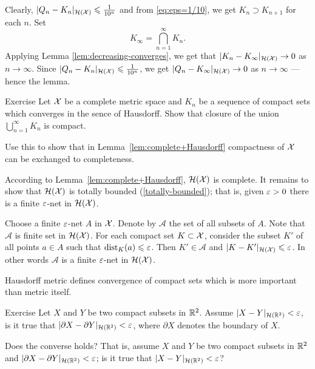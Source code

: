 Clearly, $|Q_n-K_n|_{\mathcal{H}(\mathcal{X})}\leqslant \tfrac1{10^n}$ and from \ref{eq:eps=1/10}, we get
$K_n\supset K_{n+1}$ 
for each $n$.
Set 
$$K_\infty=\bigcap_{n=1}^\infty K_n.$$
Applying Lemma \ref{lem:decreasing-converges},
we get that $|K_n-K_\infty|_{\mathcal{H}(\mathcal{X})}\to 0$ as $n\to\infty$.
Since $|Q_n-K_n|_{\mathcal{H}(\mathcal{X})}\leqslant \tfrac1{10^n}$, we get $|Q_n-K_\infty|_{\mathcal{H}(\mathcal{X})}\to 0$ as $n\to\infty$ --- hence the lemma.
\qeds

\begin{thm}{Exercise}
Let $\mathcal{X}$ be a complete metric space and $K_n$ be a sequence of compact sets 
which converges in the sence of Hausdorff.
Show that closure of the union $\bigcup_{n=1}^\infty K_n$ is compact.

Use this to show that in Lemma~\ref{lem:complete+Hausdorff} compactness of $\mathcal{X}$ can be exchanged to completeness.
\end{thm}

According to Lemma~\ref{lem:complete+Hausdorff},
$\mathcal{H}(\mathcal{X})$ is complete.
It remains to show that $\mathcal{H}(\mathcal{X})$ is totally bounded (\ref{totally-bounded});
that is, given $\varepsilon>0$ there is a finite $\varepsilon$-net in $\mathcal{H}(\mathcal{X})$.

Choose a finite $\varepsilon$-net $A$ in $\mathcal{X}$.
Denote by $\mathcal{A}$ the set of all subsets of $A$.
Note that  $\mathcal{A}$ is finite set in $\mathcal{H}(\mathcal{X})$.
For each compact set $K\subset \mathcal{X}$, consider the subset $K'$ of all points $a\in A$
such that $\mathrm{dist}_K(a)\leqslant \varepsilon$.
Then $K' \in \mathcal{A}$ and $|K-K'|_{\mathcal{H}(\mathcal{X})}\leqslant\varepsilon$.
In other words $\mathcal{A}$ is a finite $\varepsilon$-net in $\mathcal{H}(\mathcal{X})$.
\qeds

Hausdorff metric defines convergence of compact sets which is more important than metric itself.

\begin{thm}{Exercise}\label{ex:Hausdorff-bry}
Let $X$ and $Y$ be two compact subsets in $\mathbb{R}^2$.
Assume $|X-Y|_{\mathcal{H}(\mathbb{R}^2)}<\varepsilon$, 
is it true that
$|\partial X-\partial Y|_{\mathcal{H}(\mathbb{R}^2)}<\varepsilon$,
where $\partial X$ denotes the boundary of $X$.

Does the converse holds? That is, assume $X$ and $Y$ be two compact subsets in $\mathbb{R}^2$
and $|\partial X-\partial Y|_{\mathcal{H}(\mathbb{R}^2)}<\varepsilon$; 
is it true that $|X-Y|_{\mathcal{H}(\RR^2)}\z<\eps$?
\end{thm}

